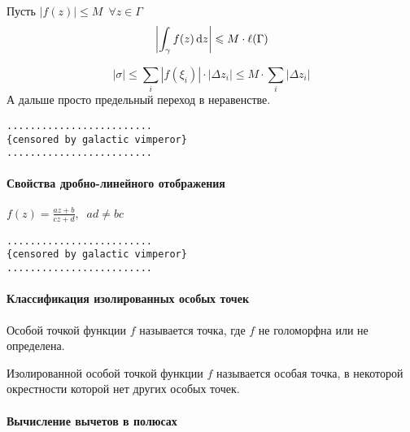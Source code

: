 \documentclass[12pt,timbord]{../../../notes}
\begin{document}
\begin{cor}\label{cor:tfcv::compint::length}
  Пусть $|f(z)| \leqslant M\;\: \forall z \in \Gamma$
  \[
    \left|\int_\gamma f(z) \,\mathrm{d} z\right| \leqslant M  \cdot \ell(\Gamma)
  \]
\end{cor}
\begin{itlproof}
  \[
    |\sigma| \leqslant \sum_{i} |f(\xi_i)| \cdot |\Delta z_i| \leqslant M \cdot \sum_i |\Delta
    z_i|
  \]
  А дальше просто  предельный переход в неравенстве.
\end{itlproof}


\begin{verbatim}
.........................
{censored by galactic vimperor}
.........................
\end{verbatim}

\setcounter{paragraph}{29}
\paragraph{Свойства дробно-линейного отображения}
\label{par:tfcv::fraclin}

\begin{defn}\label{defn:tfcv::fraclin::def}
  $\displaystyle f(z) = \frac{a z + b}{c z + d}, \;\; ad \neq bc$ 
\end{defn}

\begin{verbatim}
.........................
{censored by galactic vimperor}
.........................
\end{verbatim}
\setcounter{paragraph}{41}
\paragraph{Классификация изолированных особых точек}
\label{par:tfcv::singclass}

\begin{defn}\label{defn:tfcv::singclass::sing}
  Особой точкой функции $f$ называется точка, где $f$ не голоморфна или не определена.
\end{defn}

\begin{defn}\label{defn:tfcv::singclass::isolsing}
  Изолированной особой точкой функции $f$ называется особая точка, в некоторой окрестности которой
  нет других особых точек.
\end{defn}

\setcounter{paragraph}{45}


\paragraph{Вычисление вычетов в полюсах}
\label{par:tfcv::resuduepole}
\end{document}
